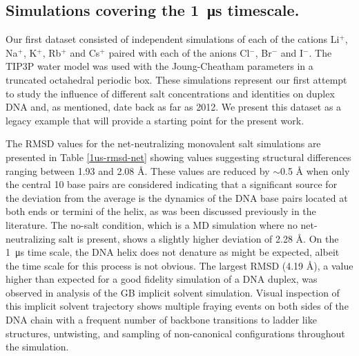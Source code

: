 \documentclass[9pt,lessons]{livecoms}
\begin{document}
\subsection{Simulations covering the \SI{1}{\micro\second} timescale.}

Our first dataset consisted of independent simulations of each of the
cations Li$^{+}$, Na$^{+}$, K$^{+}$, Rb$^{+}$ and Cs$^{+}$ paired with
each of the anions Cl$^{-}$, Br$^{-}$ and I$^{-}$. The TIP3P water
model\cite{Jorgensen1983} was used with the Joung-Cheatham
parameters\cite{Joung2008,Joung2008a} in a truncated octahedral
periodic box. These simulations represent our first attempt to study
the influence of different salt concentrations and identities on
duplex DNA and, as mentioned, date back as far as 2012. We present
this dataset as a legacy example that will provide a starting point
for the present work.
 
The RMSD values for the net-neutralizing monovalent salt simulations
are presented in Table \ref{1us-rmsd-net} showing values suggesting
structural differences ranging between 1.93 and 2.08 Å. These values
are reduced by $\sim$0.5 Å when only the central 10 base pairs are
considered indicating that a significant source for the deviation from
the average is the dynamics of the DNA base pairs located at both ends
or termini of the helix, as was been discussed previously in the
literature\cite{Galindo-Murillo2014a,Zgarbova2014}. The no-salt
condition, which is a MD simulation where no net-neutralizing salt is
present, shows a slightly higher deviation of 2.28 Å. On the
\SI{1}{\micro\second} time scale, the DNA helix does not denature as might be
expected, albeit the time scale for this process is not obvious.
The largest RMSD (4.19 Å), a value higher than expected for a good
fidelity simulation of a DNA duplex, was observed in analysis of the
GB implicit solvent simulation. Visual inspection of this implicit
solvent trajectory shows multiple fraying events on both sides of the
DNA chain with a frequent number of backbone transitions to ladder
like structures\cite{Banas2010}, untwisting, and sampling of
non-canonical configurations throughout the simulation.
\end{document}
